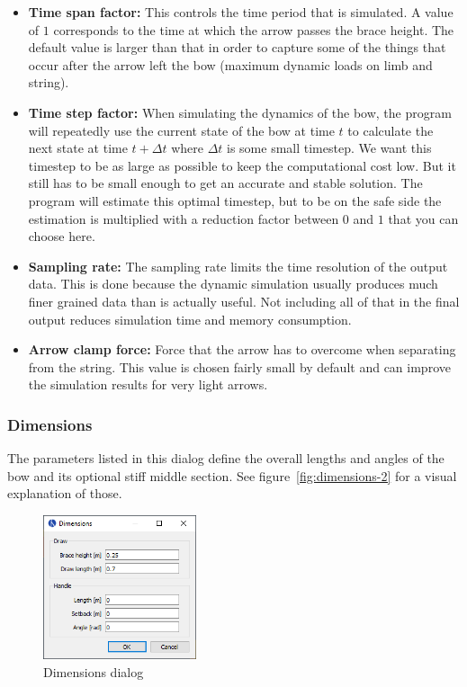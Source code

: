 \documentclass[12pt]{article}
\begin{document}
\begin{itemize}
\item \textbf{Time span factor:} This controls the time period that is simulated. A value of $1$ corresponds to the time at which the arrow passes the brace height. The default value is larger than that in order to capture some of the things that occur after the arrow left the bow (maximum dynamic loads on limb and string).
\item \textbf{Time step factor:} When simulating the dynamics of the bow, the program will repeatedly use the current state of the bow at time $t$ to calculate the next state at time $t + \Delta t$ where $\Delta t$ is some small timestep. We want this timestep to be as large as possible to keep the computational cost low. But it still has to be small enough to get an accurate and stable solution. The program will estimate this optimal timestep, but to be on the safe side the estimation is multiplied with a reduction factor between $0$ and $1$ that you can choose here.
\item \textbf{Sampling rate:} The sampling rate limits the time resolution of the output data. This is done because the dynamic simulation usually produces much finer grained data than is actually useful. Not including all of that in the final output reduces simulation time and memory consumption.
\item \textbf{Arrow clamp force:} Force that the arrow has to overcome when separating from the string.
This value is chosen fairly small by default and can improve the simulation results for very light arrows.
\end{itemize}

\newpage
\subsubsection{Dimensions}
\label{sec:dimensions}

The parameters listed in this dialog define the overall lengths and angles of the bow and its optional stiff middle section. See figure~\ref{fig:dimensions-2} for a visual explanation of those.
\bigskip

\begin{figure}[H]
\centering
\includegraphics[width=0.4\textwidth]{figures/screenshots/input/dimensions}
\caption{Dimensions dialog}
\label{fig:dimensions-1}
\end{figure}
\end{document}
